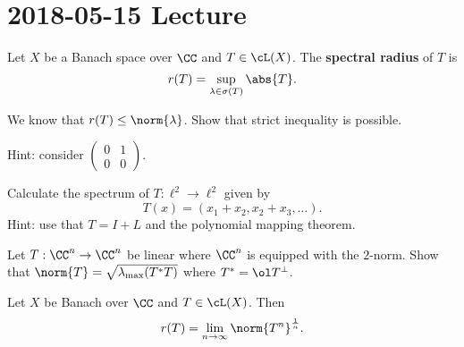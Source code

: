 \section{2018-05-15 Lecture}

\begin{defn}
  Let $X$ be a Banach space over $\CC$ and $T \in \cL(X)$.
  The \textbf{spectral radius} of $T$ is
  \[ r(T) = \sup_{\lambda\in\sigma(T)}\abs{T}. \]
\end{defn}

\begin{exer}
  We know that $r(T) \leq \norm{\lambda}$.
  Show that strict inequality is possible.

  Hint: consider
  $(\begin{smallmatrix}
    0 & 1 \\ 0 & 0
  \end{smallmatrix})$.
\end{exer}

\begin{exer}
  Calculate the spectrum of $T: \ell^2 \to \ell^2$ given by
  \[ T(x) = (x_1+x_2,x_2+x_3,\ldots).\]
  Hint: use that $T=I+L$ and the polynomial mapping theorem.
\end{exer}

\begin{exer}
  Let $T: \CC^n \to \CC^n$ be linear where $\CC^n$ is equipped with the $2$-norm.
  Show that $\norm{T} = \sqrt{\lambda_{\text{max}}(T^*T)}$ where $T^*=\ol T^\perp$.
\end{exer}

\begin{thm}[Gelfand]
  Let $X$ be Banach over $\CC$ and $T \in \cL(X)$.
  Then
  \[ r(T) = \lim_{n\to\infty}\norm{T^n}^\frac 1n. \]
\end{thm}

